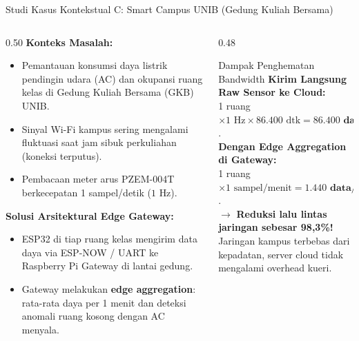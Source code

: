 \documentclass[aspectratio=169,10pt]{beamer}
\begin{document}
\begin{frame}{Studi Kasus Kontekstual C: Smart Campus UNIB (Gedung Kuliah Bersama)}
    \begin{columns}[T]
        \begin{column}{0.50\textwidth}
            \textbf{Konteks Masalah:}
            \begin{itemize}
                \item Pemantauan konsumsi daya listrik pendingin udara (AC) dan okupansi ruang kelas di Gedung Kuliah Bersama (GKB) UNIB.
                \item Sinyal Wi-Fi kampus sering mengalami fluktuasi saat jam sibuk perkuliahan (koneksi terputus).
                \item Pembacaan meter arus PZEM-004T berkecepatan 1 sampel/detik ($1\text{ Hz}$).
            \end{itemize}
            \vspace{3pt}
            \textbf{Solusi Arsitektural Edge Gateway:}
            \begin{itemize}
                \item ESP32 di tiap ruang kelas mengirim data daya via ESP-NOW / UART ke Raspberry Pi Gateway di lantai gedung.
                \item Gateway melakukan \textbf{edge aggregation}: rata-rata daya per 1 menit dan deteksi anomali ruang kosong dengan AC menyala.
            \end{itemize}
        \end{column}
        \begin{column}{0.48\textwidth}
            \begin{alertblock}{Dampak Penghematan Bandwidth}
                \textbf{Kirim Langsung Raw Sensor ke Cloud:}\\
                1 ruang $\times 1\text{ Hz} \times 86.400\text{ dtk} = \mathbf{86.400\text{ data/hari}}$.\\
                \vspace{2pt}
                \textbf{Dengan Edge Aggregation di Gateway:}\\
                1 ruang $\times 1\text{ sampel/menit} = \mathbf{1.440\text{ data/hari}}$.\\
                \vspace{2pt}
                $\to$ \textbf{Reduksi lalu lintas jaringan sebesar 98,3\%!}\\
                Jaringan kampus terbebas dari kepadatan, server cloud tidak mengalami overhead kueri.
            \end{alertblock}
        \end{column}
    \end{columns}
\end{frame}
\end{document}
